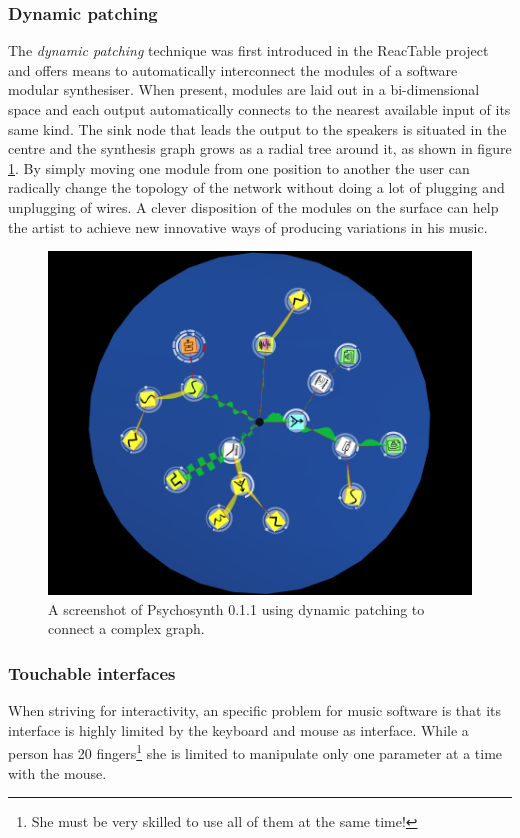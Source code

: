\subsubsection{Dynamic patching}

The \emph{dynamic patching}
\cite{kaltenbrunner04dynamic} technique was first introduced in the
ReacTable project and offers means to automatically
interconnect the modules of a software modular synthesiser. When
present, modules are laid out in a bi-dimensional space and each
output automatically connects to the nearest available input of its
same kind. The sink node that leads the output to the
speakers is situated in the centre and the synthesis graph grows as a
radial tree around it, as shown in figure \ref{fig:dynamicpatch}. By
simply moving one module from one position to another the user can
radically change the topology of the network without doing a lot of
plugging and unplugging of wires. A clever disposition of the modules
on the surface can help the artist to achieve new innovative ways of
producing variations in his music.

\begin{figure}[h!]
\centering
\includegraphics[width=.6\textwidth]{pic/dynamic-patch.png}
\caption{A screenshot of Psychosynth 0.1.1 using dynamic patching to
  connect a complex graph.}
\label{fig:dynamicpatch}
\end{figure}

\subsubsection{Touchable interfaces}

When striving for interactivity, an
specific problem for music software is that its interface is highly
limited by the keyboard and mouse as interface. While a person has 20
fingers\footnote{She must be very skilled to use all of them at the
  same time!} she is limited to manipulate only one parameter at a
time with the mouse.

